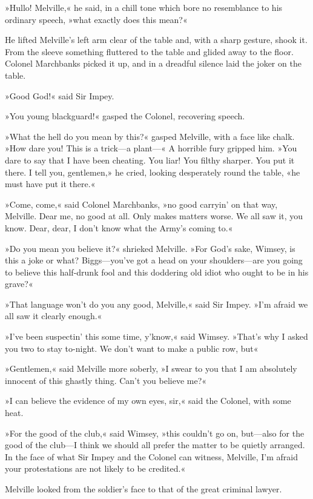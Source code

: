 »Hullo! Melville,« he said, in a chill tone which bore no resemblance to his ordinary speech, »what exactly does this mean?«

He lifted Melville's left arm clear of the table and, with a sharp gesture, shook it. From the sleeve something fluttered to the table and glided away to the floor. Colonel Marchbanks picked it up, and in a dreadful silence laid the joker on the table.

»Good God!« said Sir Impey.

»You young blackguard!« gasped the Colonel, recovering speech.

»What the hell do you mean by this?« gasped Melville, with a face like chalk. »How dare you! This is a trick—a plant—« A horrible fury gripped him. »You dare to say that I have been cheating. You liar! You filthy sharper. You put it there. I tell you, gentlemen,» he cried, looking desperately round the table, «he must have put it there.«

»Come, come,« said Colonel Marchbanks, »no good carryin' on that way, Melville. Dear me, no good at all. Only makes matters worse. We all saw it, you know. Dear, dear, I don't know what the Army's coming to.«

»Do you mean you believe it?« shrieked Melville. »For God's sake, Wimsey, is this a joke or what? Biggs—you've got a head on your shoulders—are you going to believe this half-drunk fool and this doddering old idiot who ought to be in his grave?«

»That language won't do you any good, Melville,« said Sir Impey. »I'm afraid we all saw it clearly enough.«

»I've been suspectin' this some time, y'know,« said Wimsey. »That's why I asked you two to stay to-night. We don't want to make a public row, but\longdash«

»Gentlemen,« said Melville more soberly, »I swear to you that I am absolutely innocent of this ghastly thing. Can't you believe me?«

»I can believe the evidence of my own eyes, sir,« said the Colonel, with some heat.

»For the good of the club,« said Wimsey, »this couldn't go on, but—also for the good of the club—I think we should all prefer the matter to be quietly arranged. In the face of what Sir Impey and the Colonel can witness, Melville, I'm afraid your protestations are not likely to be credited.«

Melville looked from the soldier's face to that of the great criminal lawyer.

